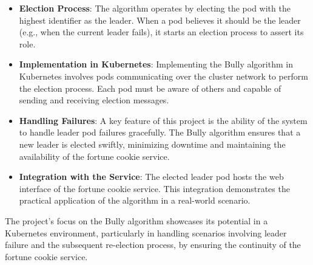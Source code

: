 \documentclass{article}
\begin{document}
    \begin{itemize}
      \item \textbf{Election Process}: The algorithm operates by electing the pod with the highest identifier as the leader. When a pod believes it should be the leader (e.g., when the current leader fails), it starts an election process to assert its role.
      \item \textbf{Implementation in Kubernetes}: Implementing the Bully algorithm in Kubernetes involves pods communicating over the cluster network to perform the election process. Each pod must be aware of others and capable of sending and receiving election messages.
      \item \textbf{Handling Failures}: A key feature of this project is the ability of the system to handle leader pod failures gracefully. The Bully algorithm ensures that a new leader is elected swiftly, minimizing downtime and maintaining the availability of the fortune cookie service.
      \item \textbf{Integration with the Service}: The elected leader pod hosts the web interface of the fortune cookie service. This integration demonstrates the practical application of the algorithm in a real-world scenario.
    \end{itemize}
    The project's focus on the Bully algorithm showcases its potential in a Kubernetes environment, particularly in handling scenarios involving leader failure and the subsequent re-election process, by ensuring the continuity of the fortune cookie service.
  
\end{document}
